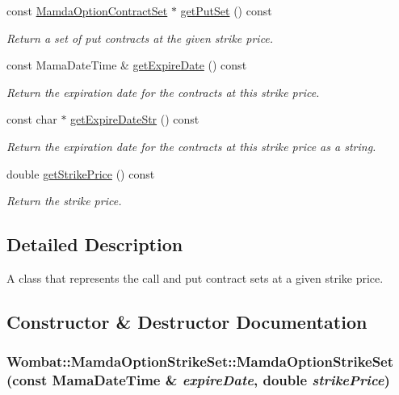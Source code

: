 \begin{CompactItemize}
const \hyperlink{classWombat_1_1MamdaOptionContractSet}{Mamda\-Option\-Contract\-Set} $\ast$ \hyperlink{classWombat_1_1MamdaOptionStrikeSet_4d25037ee3e7cea46aea4eb277418392}{get\-Put\-Set} () const 
\begin{CompactList}\small\item\em Return a set of put contracts at the given strike price. \item\end{CompactList}\item 
const Mama\-Date\-Time \& \hyperlink{classWombat_1_1MamdaOptionStrikeSet_a696f4da1cb8fffb6267e1185b345f99}{get\-Expire\-Date} () const 
\begin{CompactList}\small\item\em Return the expiration date for the contracts at this strike price. \item\end{CompactList}\item 
const char $\ast$ \hyperlink{classWombat_1_1MamdaOptionStrikeSet_a5cbca8f204f7b07d5b4869c791f150f}{get\-Expire\-Date\-Str} () const 
\begin{CompactList}\small\item\em Return the expiration date for the contracts at this strike price as a string. \item\end{CompactList}\item 
double \hyperlink{classWombat_1_1MamdaOptionStrikeSet_1a2615f85b0ac8b0edee393aaac6f334}{get\-Strike\-Price} () const 
\begin{CompactList}\small\item\em Return the strike price. \item\end{CompactList}\end{CompactItemize}


\subsection{Detailed Description}
A class that represents the call and put contract sets at a given strike price. 



\subsection{Constructor \& Destructor Documentation}
\hypertarget{classWombat_1_1MamdaOptionStrikeSet_b92d440338d96f89c7dea5b4533e887b}{
\subsubsection[MamdaOptionStrikeSet]{\setlength{\rightskip}{0pt plus 5cm}Wombat::Mamda\-Option\-Strike\-Set::Mamda\-Option\-Strike\-Set (const Mama\-Date\-Time \& {\em expire\-Date}, double {\em strike\-Price})}}
\label{classWombat_1_1MamdaOptionStrikeSet_b92d440338d96f89c7dea5b4533e887b}


